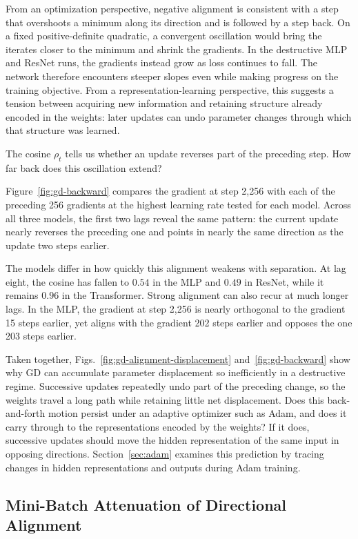 From an optimization perspective, negative alignment is consistent with a step that overshoots a minimum along its direction and is followed by a step back. On a fixed positive-definite quadratic, a convergent oscillation would bring the iterates closer to the minimum and shrink the gradients. In the destructive MLP and ResNet runs, the gradients instead grow as loss continues to fall. The network therefore encounters steeper slopes even while making progress on the training objective. From a representation-learning perspective, this suggests a tension between acquiring new information and retaining structure already encoded in the weights: later updates can undo parameter changes through which that structure was learned.

The cosine $\rho_t$ tells us whether an update reverses part of the preceding step. How far back does this oscillation extend?

Figure~\ref{fig:gd-backward} compares the gradient at step 2,256 with each of the preceding 256 gradients at the highest learning rate tested for each model. Across all three models, the first two lags reveal the same pattern: the current update nearly reverses the preceding one and points in nearly the same direction as the update two steps earlier.

The models differ in how quickly this alignment weakens with separation. At lag eight, the cosine has fallen to $0.54$ in the MLP and $0.49$ in ResNet, while it remains $0.96$ in the Transformer. Strong alignment can also recur at much longer lags. In the MLP, the gradient at step 2,256 is nearly orthogonal to the gradient 15 steps earlier, yet aligns with the gradient 202 steps earlier and opposes the one 203 steps earlier.

Taken together, Figs.~\ref{fig:gd-alignment-displacement} and~\ref{fig:gd-backward} show why GD can accumulate parameter displacement so inefficiently in a destructive regime. Successive updates repeatedly undo part of the preceding change, so the weights travel a long path while retaining little net displacement. Does this back-and-forth motion persist under an adaptive optimizer such as Adam, and does it carry through to the representations encoded by the weights? If it does, successive updates should move the hidden representation of the same input in opposing directions. Section~\ref{sec:adam} examines this prediction by tracing changes in hidden representations and outputs during Adam training.

\subsection{Mini-Batch Attenuation of Directional Alignment}
\label{sec:sgd-noise-experiments}

